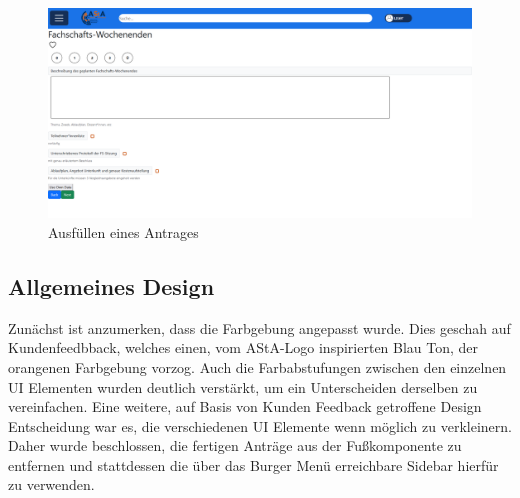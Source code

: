 \begin{figure}[h]
  \centering
    \includegraphics[width=1.0\textwidth]{Doc/images/Fill in Antrag.png}
    \caption{Ausfüllen eines Antrages}\label{Ausfüllen eines Antrages}
\end{figure}

\subsection{Allgemeines Design}\label{Allgemeines Design}
Zunächst ist anzumerken, dass die Farbgebung angepasst wurde. Dies geschah auf 
Kundenfeedbback, welches einen, vom AStA-Logo inspirierten Blau Ton, der orangenen 
Farbgebung vorzog. Auch die Farbabstufungen zwischen den einzelnen \ac{UI} Elementen 
wurden deutlich verstärkt, um ein Unterscheiden derselben zu vereinfachen.
Eine weitere, auf Basis von Kunden Feedback getroffene Design Entscheidung war es, die 
verschiedenen \ac{UI} Elemente wenn möglich zu verkleinern. Daher wurde beschlossen, die 
fertigen Anträge aus der Fußkomponente zu entfernen und stattdessen die über das Burger 
Menü erreichbare Sidebar hierfür zu verwenden.

